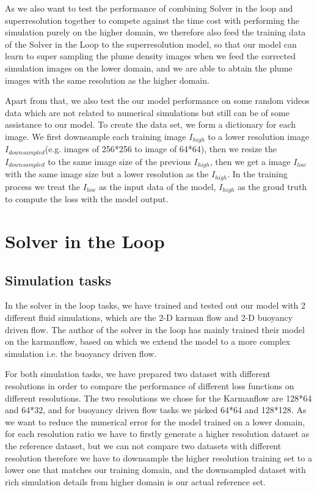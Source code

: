 \documentclass[a4paper,12pt,twoside]{report}
\begin{document}
As we also want to test the performance of combining Solver in the loop and superresolution together to compete against the time cost with performing the simulation purely on the higher domain, we therefore also feed the training data of the Solver in the Loop to the superresolution model, so that our model can learn to super sampling the plume density images when we feed the corrected simulation images on the lower domain, and we are able to abtain the plume images with the same resolution as the higher domain.

Apart from that, we also test the our model performance on some random videos data which are not related to numerical simulations but still can be of some assistance to our model.
To create the data set, we form a dictionary for each image. We first downsample each training image $I_{high}$ to a lower resolution image $I_{downsampled}$(e.g. images of 256*256 to image of 64*64), then we resize the $I_{downsampled}$ to the same image size of the previous $I_{high}$, then we get a image $I_{low}$ with the same image size but a lower resolution as the $I_{high}$. In the training process we treat the $I_{low}$ as the input data of the model, $I_{high}$ as the groud truth to compute the loss with the model output.
\section{Solver in the Loop}
\subsection{Simulation tasks}
In the solver in the loop tasks, we have trained and tested out our model with 2 different fluid simulations, which are the 2-D karman flow and 2-D buoyancy driven flow. The author of the solver in the loop has mainly trained their model on the karmanflow, based on which we extend the model to a more complex simulation i.e. the buoyancy driven flow. 

For both simulation tasks, we have prepared two dataset with different resolutions in order to compare the performance of different loss functions on different resolutions. The two resolutions we chose for the Karmanflow are 128*64 and 64*32, and for buoyancy driven flow tasks we picked 64*64 and 128*128. As we want to reduce the numerical error for the model trained on a lower domain, for each resolution ratio we have to firstly generate a higher resolution dataset as the reference dataset, but we can not compare two datasets with different resolution therefore we have to downsample the higher resolution training set to a lower one that matches our training domain, and the downsampled dataset with rich simulation details from higher domain is our actual reference set.
\end{document}
